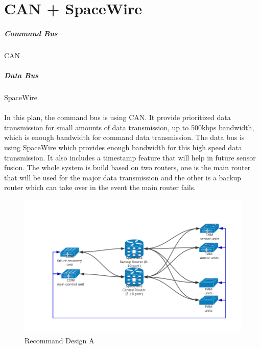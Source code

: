 \documentclass[12pt,article]{memoir}
\begin{document}
\section{CAN + SpaceWire}
\subparagraph{Command Bus}CAN
\subparagraph{Data Bus}SpaceWire\\\\
In this plan, the command bus is using CAN. It provide prioritized data transmission for small amounts of data transmission, up to 500kbps bandwidth, which is enough bandwidth for command data transmission. The data bus is using SpaceWire which provides enough bandwidth for this high speed data transmission. It also includes a timestamp feature that will help in future sensor fusion. The whole system is build based on two routers, one is the main router that will be used for the major data transmission and the other is a backup router which can take over in the event the main router fails.
\begin{figure}[htp]
\includegraphics[width=\textwidth]{img/DR00001_SpaceWire_1.png}
 \caption{Recommand Design A}	
\end{figure}
\clearpage
\end{document}
